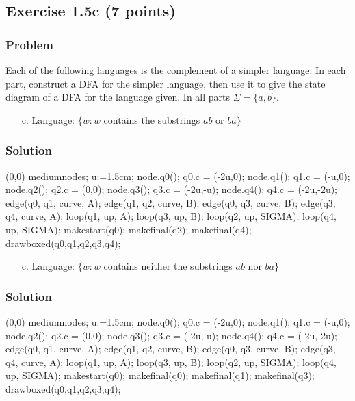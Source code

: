 \documentclass{article}
\begin{document}
\begin{empfile}
\subsection*{Exercise 1.5c (7 points)}

\subsubsection*{Problem}

Each of the following languages is the complement of a simpler
language. In each part, construct a DFA for the simpler language,
then use it to give the state diagram of a DFA for the language
given. In all parts $\Sigma=\{a,b\}$.

\begin{itemize}
\item[c.] Language: $\{w:w$ contains the substrings $ab$ or
$ba\}$
\end{itemize}

\subsubsection*{Solution}
	\begin{center}
	\begin{emp}(0,0)
	mediumnodes;
	u:=1.5cm;
	node.q0(); q0.c = (-2u,0);
	node.q1(); q1.c = (-u,0);
	node.q2(); q2.c = (0,0);
	node.q3(); q3.c = (-2u,-u);
	node.q4(); q4.c = (-2u,-2u);
	edge(q0, q1, curve, A);
	edge(q1, q2, curve, B);
	edge(q0, q3, curve, B);
	edge(q3, q4, curve, A);
	loop(q1, up, A);
	loop(q3, up, B);
	loop(q2, up, SIGMA);
	loop(q4, up, SIGMA);
	makestart(q0);
	makefinal(q2);
	makefinal(q4);
	drawboxed(q0,q1,q2,q3,q4);
	\end{emp}
	\end{center}
	
\begin{itemize}
\item[c.] Language: $\{w:w$ contains neither the substrings $ab$ nor
$ba\}$
\end{itemize}

\subsubsection*{Solution}
	\begin{center}
	\begin{emp}(0,0)
	mediumnodes;
	u:=1.5cm;
	node.q0(); q0.c = (-2u,0);
	node.q1(); q1.c = (-u,0);
	node.q2(); q2.c = (0,0);
	node.q3(); q3.c = (-2u,-u);
	node.q4(); q4.c = (-2u,-2u);
	edge(q0, q1, curve, A);
	edge(q1, q2, curve, B);
	edge(q0, q3, curve, B);
	edge(q3, q4, curve, A);
	loop(q1, up, A);
	loop(q3, up, B);
	loop(q2, up, SIGMA);
	loop(q4, up, SIGMA);
	makestart(q0);
	makefinal(q0);
	makefinal(q1);
	makefinal(q3);
	drawboxed(q0,q1,q2,q3,q4);
	\end{emp}
	\end{center}


\end{empfile}
\end{document}
